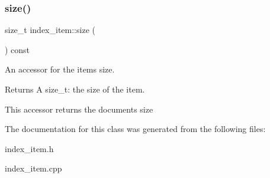 \subsubsection{\texorpdfstring{size()}{size()}}
{\footnotesize\ttfamily size\+\_\+t index\+\_\+item\+::size (\begin{DoxyParamCaption}{ }\end{DoxyParamCaption}) const}



An accessor for the item\textquotesingle{}s size. 

\begin{DoxyReturn}{Returns}
A size\+\_\+t\+: the size of the item.
\end{DoxyReturn}
This accessor returns the document\textquotesingle{}s size 

The documentation for this class was generated from the following files\+:\begin{DoxyCompactItemize}
\item 
index\+\_\+item.\+h\item 
index\+\_\+item.\+cpp\end{DoxyCompactItemize}

